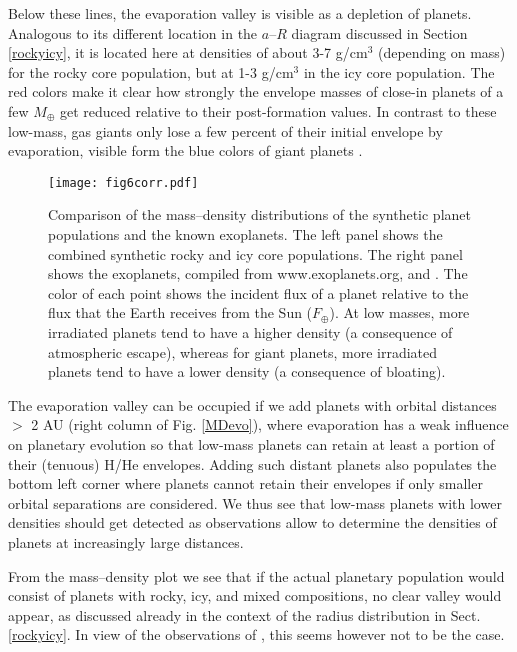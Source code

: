\documentclass[]{emulateapj}
\def\mearth{M_{\oplus}}
\begin{document}
Below these lines, the evaporation valley is visible as a depletion of planets. Analogous to its different location in the $a$--$R$ diagram discussed in Section \ref{rockyicy}, it is located here at densities of about 3-7 g/cm$^{3}$ (depending on mass) for the rocky core population, but at 1-3 g/cm$^{3}$ in the icy core population. The red colors make it clear how strongly the envelope masses of close-in planets of a few $\mearth$ get reduced relative to their post-formation values. In contrast to these low-mass, gas giants only lose a few percent of their initial envelope by evaporation, visible form the blue colors of giant planets \citep[e.g.,][]{Tian2005,Murray-Clay2009,Owen2012,Jin2014}.

\begin{figure*}
 \texttt{[image: fig6corr.pdf]}
 \caption{Comparison of the mass--density distributions of the synthetic planet populations and the known exoplanets. The left panel shows the combined synthetic rocky and icy core  populations. The right panel shows the exoplanets, compiled from www.exoplanets.org, \citet{Marcy2014} and \citet{Lissauer2013}. The color of each point shows the incident flux of a planet relative to the flux that the Earth receives from the Sun ($F_{\oplus}$). At low masses, more irradiated planets tend to have a higher density (a consequence of atmospheric escape), whereas for giant planets, more irradiated planets tend to have a lower density (a consequence of bloating).}
  \label{MDcomp}
\end{figure*}

The evaporation valley can be occupied if we add planets with orbital distances $>$ 2 AU (right column of Fig. \ref{MDevo}), where evaporation has a weak influence on planetary evolution so that low-mass planets can retain at least a portion of their (tenuous) H/He envelopes. Adding such distant planets also populates the bottom left corner where planets cannot retain their envelopes if only smaller orbital separations are considered. We thus see that low-mass planets with lower densities should get detected as observations allow to determine the densities of planets at increasingly large distances. 

From the mass--density plot we see that if the actual planetary population would consist of planets with rocky, icy, and mixed compositions, no clear valley would appear, as discussed already in the context of the radius distribution in Sect. \ref{rockyicy}. In view of the observations of \citet{Fulton2017}, this seems however not to be the case.
\end{document}
